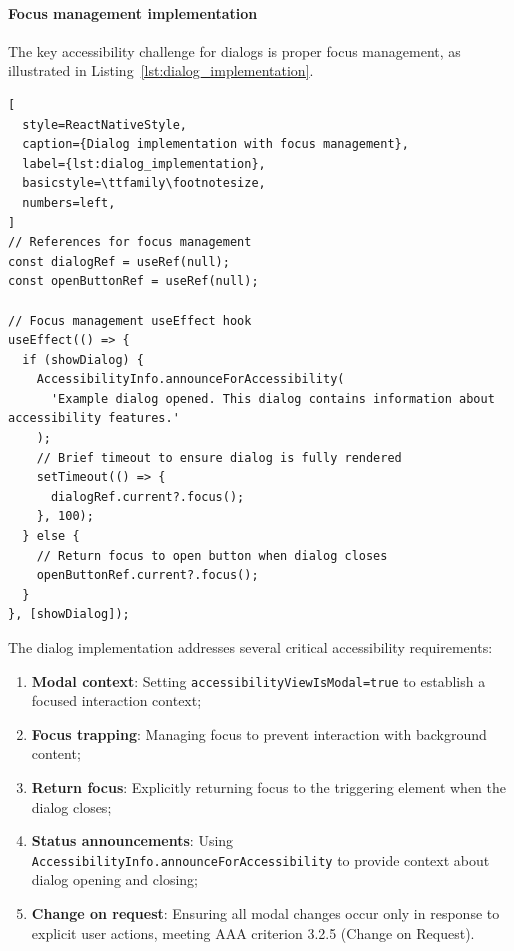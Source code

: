 \paragraph{Focus management implementation}

The key accessibility challenge for dialogs is proper focus management, as illustrated in Listing~\ref{lst:dialog_implementation}.

\begin{lstlisting}[
  style=ReactNativeStyle,
  caption={Dialog implementation with focus management},
  label={lst:dialog_implementation},
  basicstyle=\ttfamily\footnotesize,
  numbers=left,
]
// References for focus management
const dialogRef = useRef(null);
const openButtonRef = useRef(null);

// Focus management useEffect hook
useEffect(() => {
  if (showDialog) {
    AccessibilityInfo.announceForAccessibility(
      'Example dialog opened. This dialog contains information about accessibility features.'
    );
    // Brief timeout to ensure dialog is fully rendered
    setTimeout(() => {
      dialogRef.current?.focus();
    }, 100);
  } else {
    // Return focus to open button when dialog closes
    openButtonRef.current?.focus();
  }
}, [showDialog]);
\end{lstlisting}
\FloatBarrier

The dialog implementation addresses several critical accessibility requirements:

\begin{enumerate}
    \item \textbf{Modal context}: Setting \texttt{accessibilityViewIsModal=true} to establish a focused interaction context;
    
    \item \textbf{Focus trapping}: Managing focus to prevent interaction with background content;
    
    \item \textbf{Return focus}: Explicitly returning focus to the triggering element when the dialog closes;
    
    \item \textbf{Status announcements}: Using \texttt{AccessibilityInfo.announceForAccessibility} to provide context about dialog opening and closing;
    
    \item \textbf{Change on request}: Ensuring all modal changes occur only in response to explicit user actions, meeting AAA criterion 3.2.5 (Change on Request).
\end{enumerate}

